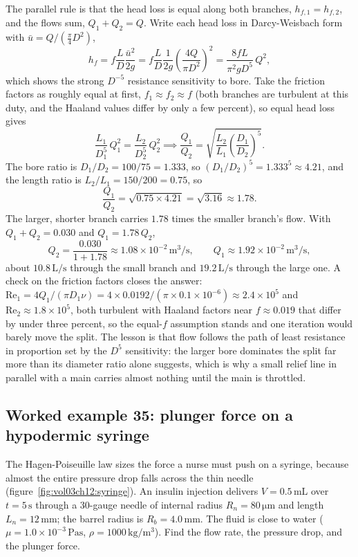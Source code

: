 The parallel rule is that the head loss is equal along both branches,
$h_{f,1} = h_{f,2}$, and the flows sum, $Q_1 + Q_2 = Q$. Write each head
loss in Darcy-Weisbach form with $\bar u = Q/(\tfrac\pi4 D^2)$,
\[
h_f = f\frac{L}{D}\frac{\bar u^2}{2g} = f\frac{L}{D}\frac{1}{2g}\!\left(
\frac{4 Q}{\pi D^2}\right)^2 = \frac{8 f L}{\pi^2 g D^5}\,Q^2,
\]
which shows the strong $D^{-5}$ resistance sensitivity to bore. Take the
friction factors as roughly equal at first, $f_1\approx f_2\approx f$
(both branches are turbulent at this duty, and the Haaland values differ
by only a few percent), so equal head loss gives
\[
\frac{L_1}{D_1^5}\,Q_1^2 = \frac{L_2}{D_2^5}\,Q_2^2 \implies
\frac{Q_1}{Q_2} = \sqrt{\frac{L_2}{L_1}\left(\frac{D_1}{D_2}\right)^5}.
\]
The bore ratio is $D_1/D_2 = 100/75 = 1.333$, so $(D_1/D_2)^5 = 1.333^5
\approx 4.21$, and the length ratio is $L_2/L_1 = 150/200 = 0.75$, so
\[
\frac{Q_1}{Q_2} = \sqrt{0.75\times4.21} = \sqrt{3.16} \approx 1.78.
\]
The larger, shorter branch carries $1.78$ times the smaller branch's
flow. With $Q_1 + Q_2 = 0.030$ and $Q_1 = 1.78\,Q_2$,
\[
Q_2 = \frac{0.030}{1 + 1.78} \approx 1.08\times10^{-2}\,\si{\meter\cubed
\per\second}, \qquad Q_1 \approx 1.92\times10^{-2}\,\si{\meter\cubed\per
\second},
\]
about $10.8\,\text{L/s}$ through the small branch and $19.2\,\text{L/s}$
through the large one. A check on the friction factors closes the answer:
$\text{Re}_1 = 4 Q_1/(\pi D_1\nu) = 4\times0.0192/(\pi\times0.1\times
10^{-6}) \approx 2.4\times10^{5}$ and $\text{Re}_2 \approx 1.8\times10^{5}$,
both turbulent with Haaland factors near $f\approx0.019$ that differ by
under three percent, so the equal-$f$ assumption stands and one iteration
would barely move the split. The lesson is that flow follows the path of
least resistance in proportion set by the $D^5$ sensitivity: the
larger bore dominates the split far more than its diameter ratio alone
suggests, which is why a small relief line in parallel with a main
carries almost nothing until the main is throttled.



\subsection*{Worked example 35: plunger force on a hypodermic syringe}

The Hagen-Poiseuille law sizes the force a nurse must push on a syringe,
because almost the entire pressure drop falls across the thin needle
(figure~\ref{fig:vol03ch12:syringe}). An insulin injection delivers
$V = 0.5\,\si{\milli\liter}$ over $t = 5\,\si{\second}$ through a
30-gauge needle of internal radius $R_n = 80\,\si{\micro\meter}$ and
length $L_n = 12\,\si{\milli\meter}$; the barrel radius is $R_b = 4.0\,
\si{\milli\meter}$. The fluid is close to water ($\mu = 1.0\times10^{-3}
\,\si{\pascal\second}$, $\rho = 1000\,\si{\kilogram\per\meter\cubed}$).
Find the flow rate, the pressure drop, and the plunger force.

